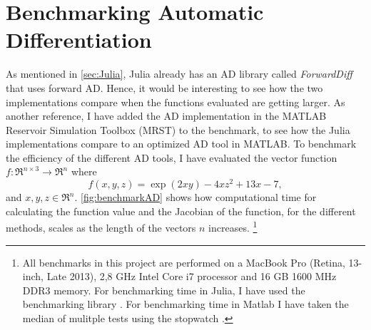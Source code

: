 \section{Benchmarking Automatic Differentiation}
As mentioned in \autoref{sec:Julia}, Julia already has an AD library called \textit{ForwardDiff} \emph{\citep{ForwardDiff}} that uses forward AD. Hence, it would be interesting to see how the two implementations compare when the functions evaluated are getting larger. As another reference, I have added the AD implementation in the MATLAB Reservoir Simulation Toolbox (MRST) \emph{\citep{mrstHomepage}} to the benchmark, to see how the Julia implementations compare to an optimized AD tool in MATLAB. To benchmark the efficiency of the different AD tools, I have evaluated the vector function $f: \Re^{n\times 3} \rightarrow \Re^n $ where
\begin{equation}
\label{eq:benchmarkFunction}
f(x,y,z)  = \exp(2xy) - 4xz^2 + 13x - 7,
\end{equation}
and $x,y,z \in \Re^n$. \autoref{fig:benchmarkAD} shows how computational time for calculating the function value and the Jacobian of the function, for the different methods, scales as the length of the vectors $n$ increases. \footnote{All benchmarks in this project are performed on a MacBook Pro (Retina, 13-inch, Late 2013), 2,8 GHz Intel Core i7 processor and 16 GB 1600 MHz DDR3 memory. For benchmarking time in Julia, I have used the benchmarking library \emph{\cite{BenchmarkTools}}. For benchmarking time in Matlab I have taken the median of mulitple tests using the stopwatch \emph{\cite{TicToc}}.}

